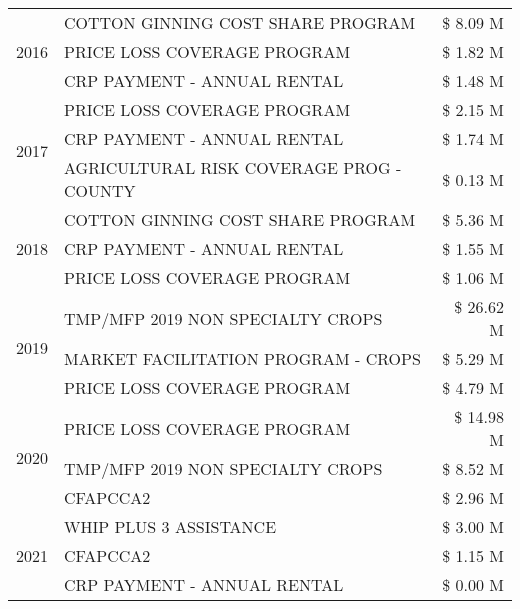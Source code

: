 \begin{tabular}{llr}
\cline{1-3}
\multirow[t]{3}{*}{2016} & COTTON GINNING COST SHARE PROGRAM & \$ 8.09 M \\
 & PRICE LOSS COVERAGE PROGRAM & \$ 1.82 M \\
 & CRP PAYMENT - ANNUAL RENTAL & \$ 1.48 M \\
\cline{1-3}
\multirow[t]{3}{*}{2017} & PRICE LOSS COVERAGE PROGRAM & \$ 2.15 M \\
 & CRP PAYMENT - ANNUAL RENTAL & \$ 1.74 M \\
 & AGRICULTURAL RISK COVERAGE PROG - COUNTY & \$ 0.13 M \\
\cline{1-3}
\multirow[t]{3}{*}{2018} & COTTON GINNING COST SHARE PROGRAM & \$ 5.36 M \\
 & CRP PAYMENT - ANNUAL RENTAL & \$ 1.55 M \\
 & PRICE LOSS COVERAGE PROGRAM & \$ 1.06 M \\
\cline{1-3}
\multirow[t]{3}{*}{2019} & TMP/MFP 2019 NON SPECIALTY CROPS & \$ 26.62 M \\
 & MARKET FACILITATION PROGRAM - CROPS & \$ 5.29 M \\
 & PRICE LOSS COVERAGE PROGRAM & \$ 4.79 M \\
\cline{1-3}
\multirow[t]{3}{*}{2020} & PRICE LOSS COVERAGE PROGRAM & \$ 14.98 M \\
 & TMP/MFP 2019 NON SPECIALTY CROPS & \$ 8.52 M \\
 & CFAPCCA2 & \$ 2.96 M \\
\cline{1-3}
\multirow[t]{3}{*}{2021} & WHIP PLUS 3 ASSISTANCE & \$ 3.00 M \\
 & CFAPCCA2 & \$ 1.15 M \\
 & CRP PAYMENT - ANNUAL RENTAL & \$ 0.00 M \\
\cline{1-3}
\bottomrule
\end{tabular}
